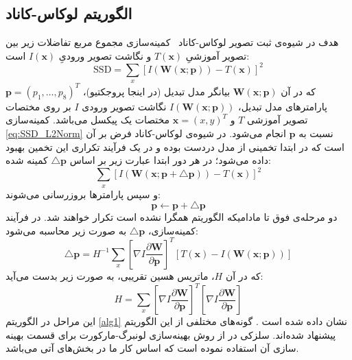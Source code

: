 \documentclass[conference]{IEEEtran-ModifiedForMVIP}
\newcommand{\warp}{\mathbf{W}(\mathbf{x};\mathbf{p})}
\newcommand{\IWarp}{I(\mathbf{W}(\mathbf{x};\mathbf{p}))}
\newcommand{\roundB}[2]{\frac{\partial{\mathbf{#1}}}{\partial{\mathbf{#2}}}}
\begin{document}
 
 
\subsection{الگوریتم لوکاس-کاناد}
 هدف در شیوه‌ی ثبت تصویر لوکاس-کاناد~\cite{Lucas81iterative} کمینه‌سازی مجموع مربع تفاضلات زیر بین تصویر آموزشیِ $T(\mathbf{x})$ و نگاشت تصویر ورودیِ $I(\mathbf{x})$ است:
 \begin{equation}\label{eq:SSD_L2Norm}
    \textrm{SSD}=\sum_x[\IWarp-T(\mathbf{x})]^2
\end{equation}
که در آن $\warp$ بیانگر مدل تبدیل‌ (در اینجا پروجکتیو)، $\mathbf{p}=(p_1,\dots,p_8)^T$ پارامترهای مدل تبدیل، $\IWarp$ نگاشت تصویر ورودی $I$ بر روی مختصات تصویر آموزشی $T$ و $\mathbf{x} =(x,y)^T$ مختصات یک پیکسل می‌باشد.
 کمینه‌سازی \eqref{eq:SSD_L2Norm} نسبت به $\mathbf{p}$ انجام می‌شود. 
در شیوه‌ی لوکاس-کاناد فرض بر آن است که در ابتدا تخمینی از مدل دردست بوده و در یک فرآیند تکراری این تخمین بهبود داده می‌شود؛
در هر دور ابتدا عبارت زیر بر اساس $\triangle\mathbf{p}$ کمینه شده:
\begin{equation}\label{eq:SSD_L2Norm_deltap}
    \sum_x[I(\mathbf{W}(\mathbf{x;\mathbf{p+\triangle p}}))-T(\mathbf{x})]^2
\end{equation}
 و سپس پارامترها بروزرسانی می‌شوند:
\begin{equation}
    \mathbf{p}\leftarrow\mathbf{p+\triangle p}
\end{equation}
دو مرحله‌ی فوق تا مادامیکه الگوریتم همگرا نشده است تکرار خواهند شد. در فرآیند کمینه‌سازی، $\mathbf{\triangle p}$ به صورت زیر محاسبه می‌شود:
\begin{equation}\label{eq:deltap}
    \triangle\mathbf{p} = H^{-1} \sum_x[\nabla I\roundB{W}{p}]^T[T(\mathbf{x})-\IWarp]
\end{equation}
که در آن $H$، ماتریس هسین تقریبی، به صورت زیر بدست می‌آید:
\begin{equation}\label{eq:Hessian}
    H = \sum_x[\nabla I\roundB{W}{p}]^T[\nabla I\roundB{W}{p}]
\end{equation}
این مراحل در الگوریتم \ref{alg1} نشان داده شده است \cite{Baker04lucas-kanade20part1}.
گونه‌های مختلفی از این الگوریتم پیشنهاد شده‌اند. سلزکی در \cite{Szeliski96video} از روش بهینه‌سازی لونبرگ-مارکورت برای قسمت بهینه سازی آن استفاده نموده است که اساس کار ما در بخش‌های آتی می‌باشد.
\end{document}
